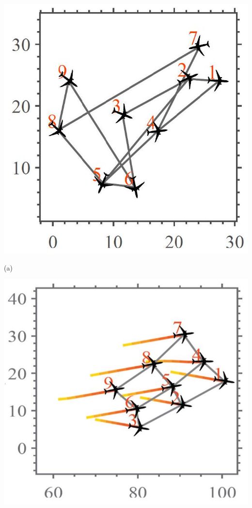 \documentclass[10pt]{article}
\begin{document}
\begin{center}
\includegraphics[max width=\textwidth]{2023_10_07_53b70c7408bc8e139415g-37(1)}
\end{center}

(a)

\begin{center}
\includegraphics[max width=\textwidth]{2023_10_07_53b70c7408bc8e139415g-37}
\end{center}
\end{document}
